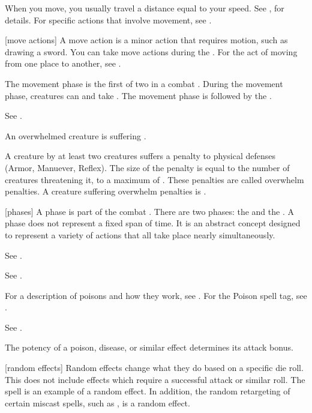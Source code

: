  When you move, you usually travel a distance equal to your speed.
See , for details.
For specific actions that involve movement, see .

[move actions] A move action is a minor action that requires motion, such as drawing a sword.
You can take move actions during the .
For the act of moving from one place to another, see .

 The movement phase is the first of two  in a combat .
During the movement phase, creatures can  and take .
The movement phase is followed by the .

 See .

 An overwhelmed creature is suffering .

 A creature  by at least two creatures suffers a penalty to physical defenses (Armor, Manuever, Reflex).
The size of the penalty is equal to the number of creatures threatening it, to a maximum of .
These penalties are called overwhelm penalties.
A creature suffering overwhelm penalties is .

[phases] A phase is part of the combat .
There are two phases: the  and the .
A phase does not represent a fixed span of time.
It is an abstract concept designed to represent a variety of actions that all take place nearly simultaneously.

 See .

 See .

 For a description of poisons and how they work, see . For the Poison spell tag, see .

 See .

 The potency of a poison, disease, or similar effect determines its attack bonus.

[random effects] Random effects change what they do based on a specific die roll.
This does not include effects which require a successful attack or similar roll.
The  spell is an example of a random effect.
In addition, the random retargeting of certain miscast spells, such as , is a random effect.

